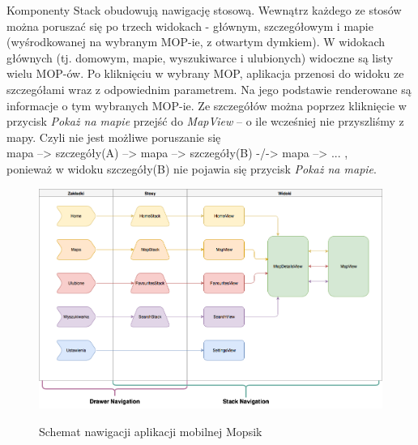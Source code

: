 Komponenty Stack obudowują nawigację stosową. Wewnątrz każdego ze stosów można poruszać się po trzech widokach - głównym, szczegółowym i mapie (wyśrodkowanej na wybranym MOP-ie, z otwartym dymkiem). W widokach głównych (tj. domowym, mapie, wyszukiwarce i ulubionych) widoczne są listy wielu MOP-ów. Po kliknięciu w wybrany MOP, aplikacja przenosi do widoku ze szczegółami wraz z odpowiednim parametrem. Na jego podstawie renderowane są informacje o tym wybranych MOP-ie. Ze szczegółów można poprzez kliknięcie w przycisk \textit{Pokaż na mapie} przejść do \textit{MapView} -- o ile wcześniej nie przyszliśmy z mapy. \newline Czyli nie jest możliwe poruszanie się\\	\indent mapa --> szczegóły(A) --> mapa --> szczegóły(B) -/-> mapa --> ... ,\\ponieważ w widoku szczegóły(B) nie pojawia się przycisk \textit{Pokaż na mapie}.


\begin{figure}[!htb]
\includegraphics[width=\textwidth]{images/mopsik_mobile_navigation.png}\label{mopsik_nav}
\caption{Schemat nawigacji aplikacji mobilnej Mopsik}
\end{figure}

